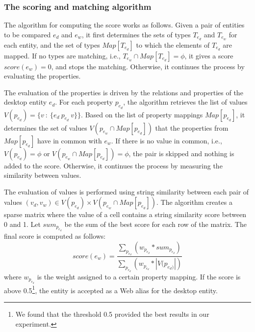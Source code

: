 \subsubsection{The scoring and matching algorithm}

The algorithm for computing the score works as follows. Given a pair of entities to be compared $e_{d}$ and $e_{w}$, it first determines the sets of types $T_{e_{d}}$ and $T_{e_{w}}$ for each entity, and the set of types $Map[T_{e_{d}}]$ to which the elements of $T_{e_{d}}$ are mapped. If no types are matching, i.e., $T_{e_{w}} \cap Map[T_{e_{d}}] = \phi$, it gives a score $score(e_{w}) = 0$, and stops the matching. Otherwise, it continues the process by evaluating the properties.

The evaluation of the properties is driven by the relations and properties of the desktop entity $e_{d}$. For each property $p_{e_{d}}$, the algorithm retrieves the list of values $V(p_{e_{d}}) = \{v\ :\ \{e_{d}\ p_{e_{d}}\ v\}\}$. Based on the list of property mappings $Map[p_{e_{d}}]$, it determines the set of values $V(p_{e_{w}} \cap Map[p_{e_{d}}])$ that the properties from $Map[p_{e_{d}}]$ have in common with $e_{w}$. If there is no value in common, i.e., $V(p_{e_{d}}) = \phi$ or $V(p_{e_{w}} \cap Map[p_{e_{d}}]) = \phi$, the pair is skipped and nothing is added to the score. Otherwise, it continues the process by measuring the similarity between values.

The evaluation of values is performed using string similarity between each pair of values $(v_{d}, v_{w}) \in V(p_{e_{d}}) \times V(p_{e_{w}} \cap Map[p_{e_{d}}])$. The algorithm creates a sparse matrix where the value of a cell contains a string similarity score between 0 and 1. Let $sum_{p_{e_{d}}}$ be the sum of the best score for each row of the matrix.
The final score is computed as follows:
$$
score(e_{w}) = \frac{\sum_{p_{e_{d}}}(w_{p_{e_{d}}}*sum_{p_{e_{d}}})}{\sum_{p_{e_{d}}}(w_{p_{e_{d}}}*\left|{V(p_{e_{d})}}\right|)}
$$
where $w_{p_{e_{d}}}$ is the weight assigned to a certain property mapping.
If the score is above 0.5\footnote{We found that the threshold 0.5 provided the best results in our experiment.}, the entity is accepted as a Web alias for the desktop entity.
